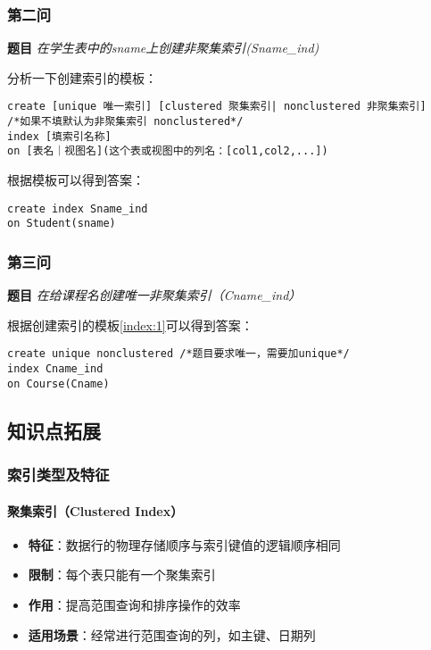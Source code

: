 \subsubsection{第二问}

\textbf{题目} \emph{在学生表中的sname上创建非聚集索引(Sname\_ind)}

\qquad 分析一下创建索引的模板：

\begin{mdframed}[backgroundcolor=gray!10]
  \label{index:1}
\begin{verbatim}
create [unique 唯一索引] [clustered 聚集索引| nonclustered 非聚集索引]
/*如果不填默认为非聚集索引 nonclustered*/
index [填索引名称]
on [表名｜视图名](这个表或视图中的列名：[col1,col2,...])
\end{verbatim}
\end{mdframed}

\qquad 根据模板可以得到答案：

\begin{mdframed}[backgroundcolor=blue!5]
\begin{verbatim}
create index Sname_ind
on Student(sname)
\end{verbatim}
\end{mdframed}

\subsubsection{第三问}

\textbf{题目} \emph{在给课程名创建唯一非聚集索引（Cname\_ind）}

\qquad 根据创建索引的模板\ref{index:1}可以得到答案：

\begin{mdframed}[backgroundcolor=blue!5]
\begin{verbatim}
create unique nonclustered /*题目要求唯一，需要加unique*/
index Cname_ind
on Course(Cname)
\end{verbatim}
\end{mdframed}

\subsection{知识点拓展}

\subsubsection{索引类型及特征}

\paragraph{聚集索引（Clustered Index）}
\begin{itemize}
  \item \textbf{特征}：数据行的物理存储顺序与索引键值的逻辑顺序相同
  \item \textbf{限制}：每个表只能有一个聚集索引
  \item \textbf{作用}：提高范围查询和排序操作的效率
  \item \textbf{适用场景}：经常进行范围查询的列，如主键、日期列
\end{itemize}

